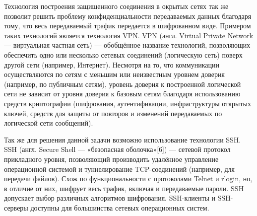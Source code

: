 Технология построения защищенного соединения в окрытых сетях так же позволит решить проблему конфиденциальности передаваемых данных благодаря тому, что весь передаваемый трафик передается в шифрованном виде. Примером таких технологий является технология VPN. VPN (англ. Virtual Private Network — виртуальная частная сеть\cite{vpn}) — обобщённое название технологий, позволяющих обеспечить одно или несколько сетевых соединений (логическую сеть) поверх другой сети (например, Интернет). Несмотря на то, что коммуникации осуществляются по сетям с меньшим или неизвестным уровнем доверия (например, по публичным сетям), уровень доверия к построенной логической сети не зависит от уровня доверия к базовым сетям благодаря использованию средств криптографии (шифрования, аутентификации, инфраструктуры открытых ключей, средств для защиты от повторов и изменений передаваемых по логической сети сообщений).

Так же для решения данной задачи возможно использование технологии SSH. SSH (англ. Secure Shell — «безопасная оболочка»[6]) — сетевой протокол прикладного уровня, позволяющий производить удалённое управление операционной системой и туннелирование TCP-соединений (например, для передачи файлов). Схож по функциональности с протоколами Telnet и rlogin, но, в отличие от них, шифрует весь трафик, включая и передаваемые пароли. SSH допускает выбор различных алгоритмов шифрования. SSH-клиенты и SSH-серверы доступны для большинства сетевых операционных систем. 

